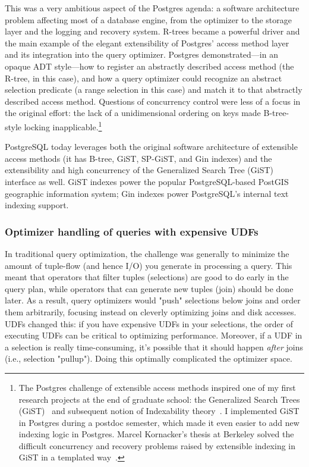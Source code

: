 \documentclass[sigconf,natbib=false]{acmart}
\begin{document}
This was a very ambitious aspect of the Postgres agenda: a software architecture problem affecting most of a database engine, from the optimizer to the storage layer and the logging and recovery system. R-trees became a powerful driver and the main example of the elegant extensibility of Postgres' access method layer and its integration into the query optimizer. Postgres demonstrated---in an opaque ADT style---how to register an abstractly described access method (the R-tree, in this case), and how a query optimizer could recognize an abstract selection predicate (a range selection in this case) and match it to that abstractly described access method. Questions of concurrency control were less of a focus in the original effort: the lack of a unidimensional ordering on keys made B-tree-style locking inapplicable.\footnote{The Postgres challenge of extensible access methods inspired one of my first research projects at the end of graduate school: the Generalized Search Trees (GiST)~\cite{Hellerstein:1995:GST:645921.673145} and subsequent notion of Indexability theory~\cite{Hellerstein:2002:MIB:505241.505244}. I implemented GiST in Postgres during a postdoc semester, which made it even easier to add new indexing logic in Postgres. Marcel Kornacker's thesis at Berkeley solved the difficult concurrency and recovery problems raised by extensible indexing in GiST in a templated way~\cite{Kornacker:1997:CRG:253260.253272}.}

PostgreSQL today leverages both the original software architecture of extensible access methods (it has B-tree, GiST, SP-GiST, and Gin indexes) and the extensibility and high concurrency of the Generalized Search Tree (GiST) interface as well. GiST indexes power the popular PostgreSQL-based PostGIS geographic information system; Gin indexes power PostgreSQL's internal text indexing support.

\subsubsection{Optimizer handling of queries with expensive UDFs}



In traditional query optimization, the challenge was generally to minimize the amount of tuple-flow (and hence I/O) you generate in processing a query. This meant that operators that filter tuples (selections) are good to do early in the query plan, while operators that can generate new tuples (join) should be done later. As a result, query optimizers would "push" selections below joins and order them arbitrarily, focusing instead on cleverly optimizing joins and disk accesses. UDFs changed this: if you have expensive UDFs in your selections, the order of executing UDFs can be critical to optimizing performance. Moreover, if a UDF in a selection is really time-consuming, it's possible that it should happen \textit{after} joins (i.e., selection "pullup"). Doing this optimally complicated the optimizer space.
\end{document}
